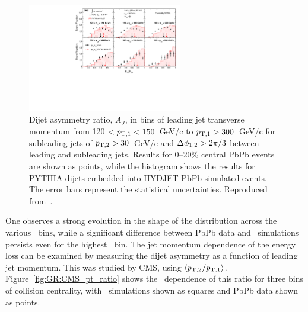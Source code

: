 \begin{figure}[!th]
\begin{center}
\includegraphics[width=0.6\textwidth]{jetfigures/dijet_imbalance5_0to20_pt_20120103_subt.pdf}
\caption{Dijet asymmetry ratio, $A_{J}$, in bins of leading jet transverse momentum from
120 $ < p_{\rm{T},1} < 150$~GeV/c to $p_{\rm{T},1} > 300$~GeV/c for
  subleading jets of $p_{\rm{T},2}> 30$~GeV/c
and $\Delta\phi_{1,2}>2\pi/3$ between leading and subleading jets.
Results for 0--20\% central PbPb events are shown as points, while the histogram
shows the results for
PYTHIA dijets embedded into HYDJET PbPb simulated events. The error bars represent the statistical uncertainties.
Reproduced from~\cite{CMS_dijet}.}
\label{fig:GR:CMS_dijet_pt}
\end{center}
\end{figure}
One observes a strong evolution in the shape of the distribution across the
various \pT\ bins, while a significant difference between PbPb data and
\PYTHYD\ simulations persists even for the highest \pT\ bin.
The jet momentum dependence of the energy loss can be examined by measuring the
dijet asymmetry as a function of leading jet momentum. This was studied by CMS,
using $\langle p_{\rm{T},2}/p_{\rm{T},1} \rangle$. Figure~\ref{fig:GR:CMS_pt_ratio}
shows the \pT\ dependence of this ratio for three
bins of collision centrality, with \PYTHYD\ simulations shown
as squares and PbPb data shown as points.

